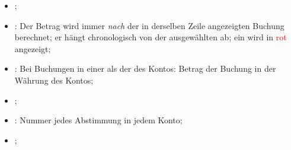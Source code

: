 \begin{itemize}
	\item {};
	\item {}: Der Betrag wird immer \emph{nach} der in derselben Zeile angezeigten Buchung berechnet; er hängt chronologisch von der ausgewählten  ab; ein  wird in \textcolor{red}{rot} angezeigt;
	\item {}: Bei Buchungen in einer  als der des Kontos: Betrag der Buchung in der Währung des Kontos;
	\item {};
	\item {}: Nummer jedes Abstimmung in jedem Konto;
	\item {};

\end{itemize}
